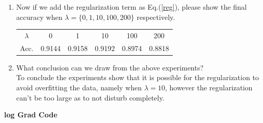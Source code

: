 \documentclass[11pt]{article}
\begin{document}
\begin{enumerate}
\begin{enumerate}
		\item Now if we add the regularization term as Eq.(\ref{reg}), please show the final accuracy when $\lambda=\{0,1,10,100,200\}$ respectively.\\
		\begin{tabular}{|c|c|c|c|c|c| }
		\hline
		$\lambda$ & 0 & 1  & 10 & 100 & 200 \\
		Acc. & 0.9144 &  0.9158 &  0.9192 &  0.8974  & 0.8818\\
		\hline
		
		\end{tabular}
		\item What conclusion can we draw from the above experiments?\\
		To conclude the experiments show that it is possible for the regularization to avoid overfitting the data, namely when $\lambda = 10$, however the regularization can't be too large as to not disturb completely. 
	\end{enumerate}
\end{enumerate}

\textbf{log Grad Code}\\

\end{document}
